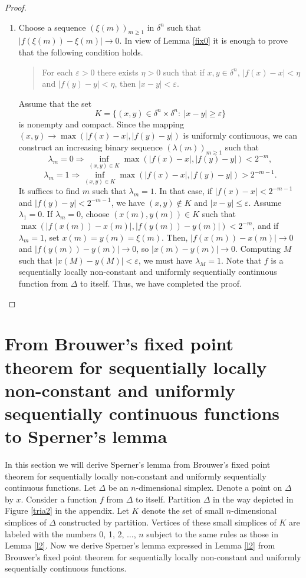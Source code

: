 \documentclass[reqno]{amsart}
\begin{document}
\begin{proof}
\begin{enumerate}
\item Choose a sequence $(\xi(m))_{m\geq 1}$ in $\delta^n$ such that $|f(\xi(m))-\xi(m)|\longrightarrow 0$. In view of Lemma \ref{fix0} it is enough to prove that the following condition holds.
\begin{quote}
For each $\varepsilon>0$ there exists $\eta>0$ such that if $x, y\in \delta^n$, $|f(x)-x|<\eta$ and $|f(y)-y|<\eta$, then $|x-y|<\varepsilon$.
\end{quote}
Assume that the set
\[K=\{(x,y)\in \delta^n\times \delta^n:\ |x-y|\geq \varepsilon\}\]
is nonempty and compact. Since the mapping $(x,y)\longrightarrow \max(|f(x)-x|,|f(y)-y|)$ is uniformly continuous, we can construct an increasing binary sequence $(\lambda(m))_{m\geq 1}$ such that
\[\lambda_m=0\Rightarrow \inf_{(x,y)\in K}\max(|f(x)-x|,|f(y)-y|)<2^{-m},\]
\[\lambda_m=1\Rightarrow \inf_{(x,y)\in K}\max(|f(x)-x|,|f(y)-y|)>2^{-m-1}.\]
It suffices to find $m$ such that $\lambda_m=1$. In that case, if $|f(x)-x|<2^{-m-1}$ and $|f(y)-y|<2^{-m-1}$, we have $(x,y)\notin K$ and $|x-y|\leq \varepsilon$. Assume $\lambda_1=0$. If $\lambda_m=0$, choose $(x(m), y(m))\in K$ such that $\max(|f(x(m))-x(m)|, |f(y(m))-y(m)|)<2^{-m}$, and if $\lambda_m=1$, set $x(m)=y(m)=\xi(m)$. Then, $|f(x(m))-x(m)|\longrightarrow 0$ and $|f(y(m))-y(m)|\longrightarrow 0$, so $|x(m)-y(m)|\longrightarrow 0$. Computing $M$ such that $|x(M)-y(M)|<\varepsilon$, we must have $\lambda_M=1$. Note that $f$ is a sequentially locally non-constant and uniformly sequentially continuous function from $\Delta$ to itself. Thus, we have completed the proof.
\end{enumerate}
\end{proof}

\section{From Brouwer's fixed point theorem for sequentially locally non-constant and uniformly sequentially continuous functions to Sperner's lemma}

In this section we will derive Sperner's lemma from Brouwer's fixed point theorem for sequentially locally non-constant and uniformly sequentially continuous functions. Let $\Delta$ be an $n$-dimensional simplex. Denote a point on $\Delta$ by $x$. Consider a function $f$ from $\Delta$ to itself. Partition $\Delta$ in the way depicted in Figure \ref{tria2} in the appendix. Let $K$ denote the set of small $n$-dimensional simplices of $\Delta$ constructed by partition. Vertices of these small simplices of $K$ are labeled with the numbers 0, 1, 2, $\dots$, $n$ subject to the same rules as those in Lemma \ref{l2}. Now we derive Sperner's lemma expressed in Lemma \ref{l2} from Brouwer's fixed point theorem for sequentially locally non-constant and uniformly sequentially continuous functions.
\end{document}
